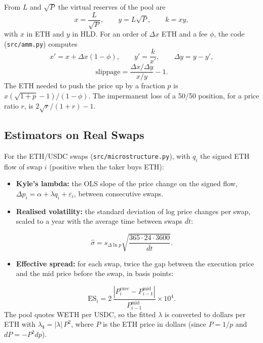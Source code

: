 \documentclass[11pt,a4paper]{article}
\begin{document}
From $L$ and $\sqrt P$ the virtual reserves of the pool are
\begin{equation}
x=\frac{L}{\sqrt P},\qquad y=L\sqrt P,\qquad k=xy,
\end{equation}
with $x$ in ETH and $y$ in HLD. For an order of $\Delta x$ ETH and a fee $\phi$, the code (\texttt{src/amm.py}) computes
\begin{equation}
x'=x+\Delta x(1-\phi),\qquad y'=\frac{k}{x'},\qquad \Delta y=y-y',
\end{equation}
\begin{equation}
\text{slippage}=\frac{\Delta x/\Delta y}{x/y}-1 .
\end{equation}
The ETH needed to push the price up by a fraction $p$ is $x(\sqrt{1+p}-1)/(1-\phi)$. The impermanent loss of a 50/50 position, for a price ratio $r$, is $2\sqrt r/(1+r)-1$.

\subsection{Estimators on Real Swaps}

For the ETH/USDC swaps (\texttt{src/microstructure.py}), with $q_i$ the signed ETH flow of swap $i$ (positive when the taker buys ETH):
\begin{itemize}
\item \textbf{Kyle's lambda:} the OLS slope of the price change on the signed flow, $\Delta p_i=\alpha+\lambda q_i+\varepsilon_i$, between consecutive swaps.
\item \textbf{Realised volatility:} the standard deviation of log price changes per swap, scaled to a year with the average time between swaps $\bar{dt}$:
\end{itemize}
\begin{equation}
\hat\sigma=s_{\Delta\ln p}\sqrt{\frac{365\cdot24\cdot3600}{\bar{dt}}}.
\end{equation}
\begin{itemize}
\item \textbf{Effective spread:} for each swap, twice the gap between the execution price and the mid price before the swap, in basis points:
\end{itemize}
\begin{equation}
\text{ES}_i=2\,\frac{|P^{\text{exec}}_i-P^{\text{mid}}_{i-1}|}{P^{\text{mid}}_{i-1}}\times10^4 .
\end{equation}
The pool quotes WETH per USDC, so the fitted $\lambda$ is converted to dollars per ETH with $\lambda_{\$}=|\lambda|\,P^2$, where $P$ is the ETH price in dollars (since $P=1/p$ and $dP=-P^2dp$).
\end{document}

